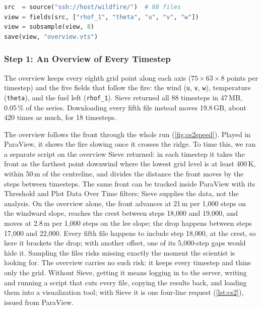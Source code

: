 \documentclass{vgtc}
\newcommand{\sname}{Sieve}
\newcommand{\code}[1]{\texttt{#1}}
\begin{document}
\begin{lstlisting}[language=Python, label=lst:cs2, caption={Step~1: the
overview. Every timestep, every eighth grid point along each axis, five fields.}]
src  = source("ssh://host/wildfire/")  # 88 files
view = fields(src, ["rhof_1", "theta", "u", "v", "w"])
view = subsample(view, 8)
save(view, "overview.vts")
\end{lstlisting}

\subsubsection{Step 1: An Overview of Every Timestep}

The overview keeps every eighth grid point along each axis ($75 \times 63 \times 8$ points
per timestep) and the five fields that follow the fire: the wind (\code{u}, \code{v},
\code{w}), temperature (\code{theta}), and the fuel left (\code{rhof\_1}). \sname{}
returned all 88 timesteps in 47\,MB, 0.05\,\% of the series. Downloading every fifth file
instead moves 19.8\,GB, about 420 times as much, for 18 timesteps.

The overview follows the front through the whole run (\cref{fig:cs2speed}). Played in
ParaView, it shows the fire slowing once it crosses the ridge. To time this, we ran a
separate script on the overview \sname{} returned: in each timestep it takes the front as
the farthest point downwind where the lowest grid level is at least 400\,K, within 50\,m
of the centreline, and divides the distance the front moves by the steps between
timesteps. The same front can be tracked inside ParaView with its Threshold and Plot Data
Over Time filters; \sname{} supplies the data, not the analysis. On the overview alone, the
front advances at 21\,m per 1{,}000 steps on the windward slope, reaches the
crest between steps 18{,}000 and 19{,}000, and moves at 2.8\,m per 1{,}000 steps on the lee slope; the drop
happens between steps 17{,}000 and 22{,}000. Every fifth file happens to include step
18{,}000, at the crest, so here it brackets the drop; with another offset, one of its
5{,}000-step gaps would hide it. Sampling the files risks missing exactly the moment the scientist is
looking for. The overview carries no such risk: it keeps every timestep and thins only the
grid. Without \sname{}, getting it means logging in to the server, writing and running a
script that cuts every file, copying the results back, and loading them into a
visualization tool; with \sname{} it is one four-line request (\cref{lst:cs2}), issued
from ParaView.
\end{document}
